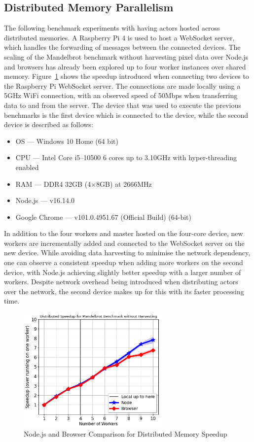 \documentclass[oneside]{um-fict}
\begin{document}
\subsection{Distributed Memory Parallelism}
The following benchmark experiments with having actors hosted across distributed memories. A Raspberry Pi 4 is used to host a WebSocket server, which handles the forwarding of messages between the connected devices. The scaling of the Mandelbrot benchmark without harvesting pixel data over Node.js and browsers has already been explored up to four worker instances over shared memory. Figure~\ref{fig:distributed_memory_speedup} shows the speedup introduced when connecting two devices to the Raspberry Pi WebSocket server. The connections are made locally using a 5GHz WiFi connection, with an observed speed of 50Mbps when transferring data to and from the server. The device that was used to execute the previous benchmarks is the first device which is connected to the device, while the second device is described as follows: 
\begin{itemize}
    \item OS --- Windows 10 Home (64 bit)
    \item CPU --- Intel Core i5--10500 6 cores up to 3.10GHz with hyper-threading enabled
    \item RAM --- DDR4 32GB (4$\times$8GB) at 2666MHz
    \item Node.js --- v16.14.0
    \item Google Chrome --- v101.0.4951.67 (Official Build) (64-bit)
\end{itemize}
In addition to the four workers and master hosted on the four-core device, new workers are incrementally added and connected to the WebSocket server on the new device. While avoiding data harvesting to minimise the network dependency, one can observe a consistent speedup when adding more workers on the second device, with Node.js achieving slightly better speedup with a larger number of workers. Despite network overhead being introduced when distributing actors over the network, the second device makes up for this with its faster processing time.
\begin{figure}[H]
    \begin{centering}
        \includegraphics[width=280px]{resources/distributed_memory_speedup.png}
        \caption{Node.js and Browser Comparison for Distributed Memory Speedup}\label{fig:distributed_memory_speedup}
    \end{centering}
\end{figure}
\end{document}
